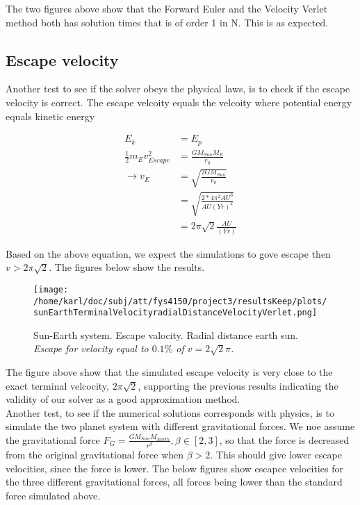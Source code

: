 \documentclass{article}
\begin{document}
The two figures above show that the Forward Euler and the Velocity Verlet method both has solution times that is of order 1 in N. This is as expected. 


\subsection{Escape velocity}
Another test to see if the solver obeys the physical laws, is to check if the escape velocity is correct. The escape velcoity equals the velcoity where potential energy equals kinetic energy

\begin{subequations}
	\begin{align}
	E_k  &= E_p \\
	\frac{1}{2} m_E v_{Escape}^2&= \frac{G M_{Sun} M_E}{r_0}\\
	\rightarrow v_E&=\sqrt{\frac{2G M_{Sun} }{r_0}}\\
	&=\sqrt{\frac{2* 4 \pi^2 AU^3 }{AU (Yr)^2}}\\
	&=2 \pi\sqrt{2}\frac{ AU }{(Yr)}
	\end{align}
\end{subequations}

Based on the above equation, we expect the simulations to gove escape then $v > 2\pi \sqrt{2}$. The figures below show the results.

\begin{figure}[H]
	\centering
	\texttt{[image: /home/karl/doc/subj/att/fys4150/project3/resultsKeep/plots/sunEarthTerminalVelocityradialDistanceVelocityVerlet.png]}
	\caption{Sun-Earth system. Escape valocity. Radial distance earth sun. \\ \textit{Escape for velocity equal to $0.1 \%$ of  $v = 2\sqrt{2}\pi$.}}
	\label{1}
\end{figure}



The figure above show that the simulated escape velocity is very close to the exact terminal velcocity, $2 \pi \sqrt{2}$, supporting the previous results indicating the validity of our solver as a good approximation method.\\

Another test, to see if the numerical solutions corresponds with physics, is to simulate the two planet system with different gravitational forces. We noe assume the gravitational force $F_G = \frac{G M_{Sun} M_{Earth}}{r^\beta}, \beta \in [2,3]$, so that the force is decreased from the original gravitational force when $\beta > 2$. This should give lower escape velocities, since the force is lower. The below figures show escapce velocities for the three different gravitational forces, all forces being lower than the standard force simulated above.
\end{document}
